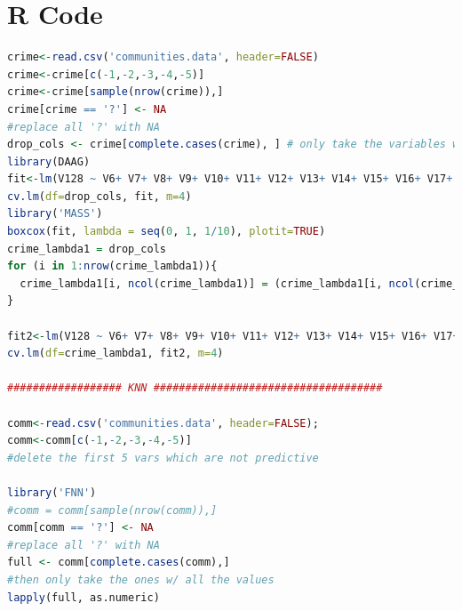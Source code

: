 \documentclass{article}
\begin{document}
\section{R Code}
\begin{lstlisting}[language=r]
crime<-read.csv('communities.data', header=FALSE)
crime<-crime[c(-1,-2,-3,-4,-5)]
crime<-crime[sample(nrow(crime)),]
crime[crime == '?'] <- NA
#replace all '?' with NA
drop_cols <- crime[complete.cases(crime), ] # only take the variables w/ all the values
library(DAAG)
fit<-lm(V128 ~ V6+ V7+ V8+ V9+ V10+ V11+ V12+ V13+ V14+ V15+ V16+ V17+ V18+ V19+ V20+ V21+ V22+ V23+ V24+ V25+ V26+ V27+ V28+ V29+ V30+ V32+ V33+ V34+ V35+ V36+ V37+ V38+ V39+ V40+ V41+ V42+ V43+ V44+ V45+ V46+ V47+ V48+ V49+ V50+ V51+ V52+ V53+ V54+ V55+ V56+ V57+ V58+ V59+ V60+ V61+ V62+ V63+ V64+ V65+ V66+ V67+ V68+ V69+ V70+ V71+ V72+ V73+ V74+ V75+ V76+ V77+ V78+ V79+ V80+ V81+ V82+ V83+ V84+ V85+ V86+ V87+ V88+ V89+ V90+ V91+ V92+ V93+ V94+ V95+ V96+ V97+ V98+ V99+ V100+ V101+ V119+ V120+ V121+ V126, data=drop_cols)
cv.lm(df=drop_cols, fit, m=4)
library('MASS')
boxcox(fit, lambda = seq(0, 1, 1/10), plotit=TRUE)
crime_lambda1 = drop_cols
for (i in 1:nrow(crime_lambda1)){
  crime_lambda1[i, ncol(crime_lambda1)] = (crime_lambda1[i, ncol(crime_lambda1)]^0.3-1)/0.3
}

fit2<-lm(V128 ~ V6+ V7+ V8+ V9+ V10+ V11+ V12+ V13+ V14+ V15+ V16+ V17+ V18+ V19+ V20+ V21+ V22+ V23+ V24+ V25+ V26+ V27+ V28+ V29+ V30+ V32+ V33+ V34+ V35+ V36+ V37+ V38+ V39+ V40+ V41+ V42+ V43+ V44+ V45+ V46+ V47+ V48+ V49+ V50+ V51+ V52+ V53+ V54+ V55+ V56+ V57+ V58+ V59+ V60+ V61+ V62+ V63+ V64+ V65+ V66+ V67+ V68+ V69+ V70+ V71+ V72+ V73+ V74+ V75+ V76+ V77+ V78+ V79+ V80+ V81+ V82+ V83+ V84+ V85+ V86+ V87+ V88+ V89+ V90+ V91+ V92+ V93+ V94+ V95+ V96+ V97+ V98+ V99+ V100+ V101+ V119+ V120+ V121+ V126, data=crime_lambda1)
cv.lm(df=crime_lambda1, fit2, m=4)

################## KNN ####################################

comm<-read.csv('communities.data', header=FALSE);
comm<-comm[c(-1,-2,-3,-4,-5)] 
#delete the first 5 vars which are not predictive

library('FNN')
#comm = comm[sample(nrow(comm)),]
comm[comm == '?'] <- NA
#replace all '?' with NA
full <- comm[complete.cases(comm),]
#then only take the ones w/ all the values
lapply(full, as.numeric)


\end{lstlisting}
\end{document}
